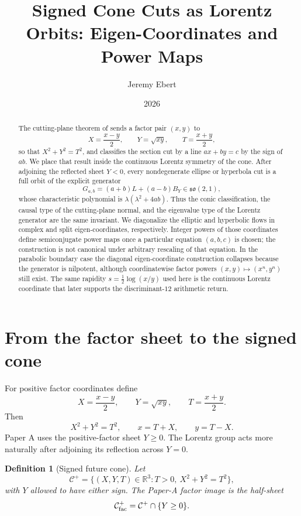 \documentclass[11pt]{amsart}
\title{Signed Cone Cuts as Lorentz Orbits: Eigen-Coordinates and Power Maps}
\author{Jeremy Ebert}
\date{2026}
\newtheorem{definition}[theorem]{Definition}
\theoremstyle{remark}
\begin{document}
\begin{abstract}
The cutting-plane theorem of \cite{Ebert2026Table} sends a factor pair $(x,y)$ to
\[
X=\frac{x-y}{2},\qquad Y=\sqrt{xy},\qquad T=\frac{x+y}{2},
\]
so that $X^2+Y^2=T^2$, and classifies the section cut by a line $ax+by=c$ by the sign of $ab$.  We place that result inside the continuous Lorentz symmetry of the cone.  After adjoining the reflected sheet $Y<0$, every nondegenerate ellipse or hyperbola cut is a full orbit of the explicit generator
\[
G_{a,b}=(a+b)L+(a-b)B_Y\in\mathfrak{so}(2,1),
\]
whose characteristic polynomial is $\lambda(\lambda^2+4ab)$.  Thus the conic classification, the causal type of the cutting-plane normal, and the eigenvalue type of the Lorentz generator are the same invariant.  We diagonalize the elliptic and hyperbolic flows in complex and split eigen-coordinates, respectively.  Integer powers of those coordinates define semiconjugate power maps once a particular equation $(a,b,c)$ is chosen; the construction is not canonical under arbitrary rescaling of that equation.  In the parabolic boundary case the diagonal eigen-coordinate construction collapses because the generator is nilpotent, although coordinatewise factor powers $(x,y)\mapsto(x^n,y^n)$ still exist.  The same rapidity $s=\tfrac12\log(x/y)$ used here is the continuous Lorentz coordinate that later supports the discriminant-$12$ arithmetic return.
\end{abstract}

\maketitle

\section{From the factor sheet to the signed cone}

For positive factor coordinates define
\begin{equation}\label{eq:mean}
X=\frac{x-y}{2},\qquad Y=\sqrt{xy},\qquad T=\frac{x+y}{2}.
\end{equation}
Then
\begin{equation}\label{eq:cone}
X^2+Y^2=T^2,
\qquad
x=T+X,
\qquad
y=T-X.
\end{equation}
Paper A \cite{Ebert2026Table} uses the positive-factor sheet $Y\ge0$.  The Lorentz group acts more naturally after adjoining its reflection across $Y=0$.

\begin{definition}[Signed future cone]
Let
\[
\mathcal C^+
=\{(X,Y,T)\in\mathbb R^3:T>0,\ X^2+Y^2=T^2\},
\]
with $Y$ allowed to have either sign.  The Paper-A factor image is the half-sheet
\[
\mathcal C^+_{\rm fac}=\mathcal C^+\cap\{Y\ge0\}.
\]
\end{definition}
\end{document}
